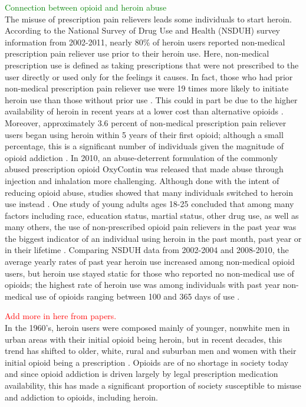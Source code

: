\documentclass[12pt]{article}
\begin{document}
\textcolor{green}{Connection between opioid and heroin abuse} \\
The misuse of prescription pain relievers leads some individuals to start heroin. %
According to the National Survey of Drug Use and Health (NSDUH) survey information from 2002-2011, nearly 80\% of heroin users reported non-medical prescription pain reliever use prior to their heroin use. Here, non-medical prescription use is defined as taking prescriptions that were not prescribed to the user directly or used only for the feelings it causes. In fact, those who had prior non-medical prescription pain reliever use were 19 times more likely to initiate heroin use than those without prior use \cite{Muhuri}. This could in part be due to the higher availability of heroin in recent years at a lower cost than alternative opioids \cite{NIDA1}. Moreover, approximately 3.6 percent of non-medical prescription pain reliever users began using heroin within 5 years of their first opioid; although a small percentage, this is a significant number of individuals given the magnitude of opioid addiction \cite{Muhuri}. In 2010, an abuse-deterrent formulation of the commonly abused prescription opioid OxyContin was released that made abuse through injection and inhalation more challenging. Although done with the intent of reducing opioid abuse, studies showed that many individuals switched to heroin use instead \cite{Cicero2, Cicero3}. One study of young adults ages 18-25 concluded that among many factors including race, education status, martial status, other drug use, as well as many others, the use of non-prescribed opioid pain relievers in the past year was the biggest indicator of an individual using heroin in the past month, past year or in their lifetime \cite{Ihongbe}. Comparing NSDUH data from 2002-2004 and 2008-2010, the average yearly rates of past year heroin use increased among non-medical opioid users, but heroin use stayed static for those who reported no non-medical use of opioids; the highest rate of heroin use was among individuals with past year non-medical use of opioids ranging between 100 and 365 days of use \cite{Jones}. 

\textcolor{red}{Add more in here from papers.}\\ In the 1960's, heroin users were composed mainly of younger, nonwhite men in urban areas with their initial opioid being heroin, but in recent decades, this trend has shifted to older, white, rural and suburban men and women with their initial opioid being a prescription \cite{Cicero}. Opioids are of no shortage in society today and since opioid addiction is driven largely by legal prescription medication availability, this has made a significant proportion of society susceptible to misuse and addiction to opioids, including heroin. 
\end{document}
